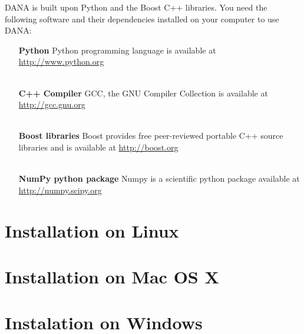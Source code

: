 DANA is built upon Python and the Boost C++ libraries. You need the following
software and their dependencies installed on your computer to use DANA:

\begin{itemize}
    \item [{\bf Python}]
          Python programming language is available at \url{http://www.python.org}\\
          \\
          
    \item [{\bf C++ Compiler}]
          GCC, the GNU Compiler Collection is available at \url{http://gcc.gnu.org}\\
          \\
          
    \item [{\bf Boost libraries}]
          Boost provides free peer-reviewed portable C++ source libraries and
          is available at \url{http://boost.org}\\
          \\
          
     \item [{\bf NumPy python package}]
           Numpy is a scientific python package available at \url{http://numpy.scipy.org}

\end{itemize}

\section{Installation on Linux}
\section{Installation on Mac OS X}
\section{Instalation on Windows}

